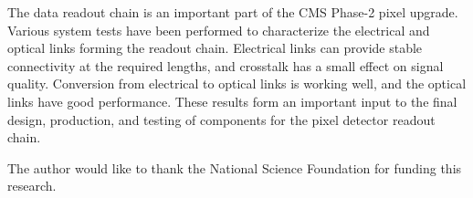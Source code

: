 \documentclass[a4paper,11pt]{article}
\begin{document}
The data readout chain is an important part of the CMS Phase-2 pixel upgrade.
Various system tests have been performed to characterize the electrical and optical links forming the readout chain.
Electrical links can provide stable connectivity at the required lengths, and crosstalk has a small effect on signal quality.
Conversion from electrical to optical links is working well, and the optical links have good performance.
These results form an important input to the final design, production, and testing of components for the pixel detector readout chain.


\acknowledgments

The author would like to thank the National Science Foundation for funding this research.

\end{document}
